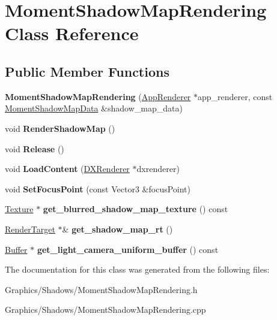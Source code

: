 \hypertarget{classMomentShadowMapRendering}{}\section{Moment\+Shadow\+Map\+Rendering Class Reference}
\label{classMomentShadowMapRendering}
\subsection*{Public Member Functions}
\begin{DoxyCompactItemize}
\item 
\mbox{\label{classMomentShadowMapRendering_a854281a6df9dad9c006515b6e31da261}} 
{\bfseries Moment\+Shadow\+Map\+Rendering} (\hyperlink{classAppRenderer}{App\+Renderer} $\ast$app\+\_\+renderer, const \hyperlink{structMomentShadowMapData}{Moment\+Shadow\+Map\+Data} \&shadow\+\_\+map\+\_\+data)
\item 
\mbox{\label{classMomentShadowMapRendering_ae5007fc91d6cfa30c9982bbf48f53388}} 
void {\bfseries Render\+Shadow\+Map} ()
\item 
\mbox{\label{classMomentShadowMapRendering_ad438794c59d38477c25b189260f55b64}} 
void {\bfseries Release} ()
\item 
\mbox{\label{classMomentShadowMapRendering_a06d7be5623d4e862ec15dacf7f2036cc}} 
void {\bfseries Load\+Content} (\hyperlink{classDXRenderer}{D\+X\+Renderer} $\ast$dxrenderer)
\item 
\mbox{\label{classMomentShadowMapRendering_a5fd596382581dc8cbc008eae8c8b5885}} 
void {\bfseries Set\+Focus\+Point} (const Vector3 \&focus\+Point)
\item 
\mbox{\label{classMomentShadowMapRendering_a399e3394fe7f75f5c90bcdbdcd3ed056}} 
\hyperlink{classTexture}{Texture} $\ast$ {\bfseries get\+\_\+blurred\+\_\+shadow\+\_\+map\+\_\+texture} () const
\item 
\mbox{\label{classMomentShadowMapRendering_a66767cb9590804962198adc3100d3334}} 
\hyperlink{classRenderTarget}{Render\+Target} $\ast$\& {\bfseries get\+\_\+shadow\+\_\+map\+\_\+rt} ()
\item 
\mbox{\label{classMomentShadowMapRendering_ab33d553299d67cfeaeef7e8af1816876}} 
\hyperlink{classBuffer}{Buffer} $\ast$ {\bfseries get\+\_\+light\+\_\+camera\+\_\+uniform\+\_\+buffer} () const
\end{DoxyCompactItemize}


The documentation for this class was generated from the following files\+:\begin{DoxyCompactItemize}
\item 
Graphics/\+Shadows/Moment\+Shadow\+Map\+Rendering.\+h\item 
Graphics/\+Shadows/Moment\+Shadow\+Map\+Rendering.\+cpp\end{DoxyCompactItemize}

